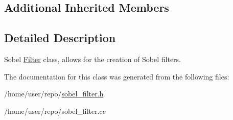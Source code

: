 \subsection*{Additional Inherited Members}


\subsection{Detailed Description}
Sobel \hyperlink{classFilter}{Filter} class, allows for the creation of Sobel filters. 

The documentation for this class was generated from the following files\+:\begin{DoxyCompactItemize}
\item 
/home/user/repo/\hyperlink{sobel__filter_8h}{sobel\+\_\+filter.\+h}\item 
/home/user/repo/sobel\+\_\+filter.\+cc\end{DoxyCompactItemize}
